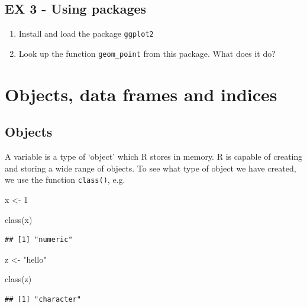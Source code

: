 \documentclass[]{article}
\newenvironment{Shaded}{\begin{snugshade}}{\end{snugshade}}
\newcommand{\DecValTok}[1]{\textcolor[rgb]{0.00,0.00,0.81}{#1}}
\newcommand{\FunctionTok}[1]{\textcolor[rgb]{0.00,0.00,0.00}{#1}}
\newcommand{\NormalTok}[1]{#1}
\newcommand{\OtherTok}[1]{\textcolor[rgb]{0.56,0.35,0.01}{#1}}
\newcommand{\StringTok}[1]{\textcolor[rgb]{0.31,0.60,0.02}{#1}}
\providecommand{\tightlist}{%
  \setlength{\itemsep}{0pt}\setlength{\parskip}{0pt}}
\begin{document}
\hypertarget{ex-3---using-packages}{%
\subsection{EX 3 - Using packages}\label{ex-3---using-packages}}

\begin{enumerate}
\def\labelenumi{\arabic{enumi}.}
\tightlist
\item
  Install and load the package \texttt{ggplot2}
\item
  Look up the function \texttt{geom\_point} from this package. What does
  it do?
\end{enumerate}

\hypertarget{objects-data-frames-and-indices}{%
\section{Objects, data frames and
indices}\label{objects-data-frames-and-indices}}

\hypertarget{objects}{%
\subsection{Objects}\label{objects}}

A variable is a type of `object' which R stores in memory. R is capable
of creating and storing a wide range of objects. To see what type of
object we have created, we use the function \texttt{class()}, e.g.

\begin{Shaded}
\begin{Highlighting}[]
\NormalTok{x }\OtherTok{\textless{}{-}} \DecValTok{1}

\FunctionTok{class}\NormalTok{(x)}
\end{Highlighting}
\end{Shaded}

\begin{verbatim}
## [1] "numeric"
\end{verbatim}

\begin{Shaded}
\begin{Highlighting}[]
\NormalTok{z }\OtherTok{\textless{}{-}} \StringTok{"hello"}

\FunctionTok{class}\NormalTok{(z)}
\end{Highlighting}
\end{Shaded}

\begin{verbatim}
## [1] "character"
\end{verbatim}
\end{document}
